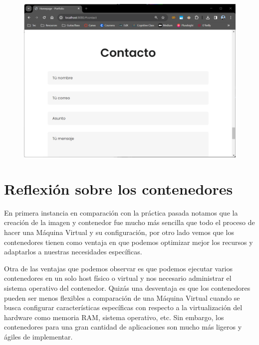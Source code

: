 \documentclass[12pt,a4paper]{article}
\begin{document}
\begin{figure}[H]
    \centering
    \includegraphics[width=.85\linewidth]{M3_Virtualización_y_Contenedores/Tarea_3_Creación_Contenedor_Docker/reporte/figuras/7-2_Resultados.png}
    \label{fig:Resultados_2}
\end{figure}


\section{Reflexión sobre los contenedores}

En primera instancia en comparación con la práctica pasada notamos que la creación de la imagen y contenedor fue mucho más sencilla que todo el proceso de hacer una Máquina Virtual y su configuración, por otro lado vemos que los contenedores tienen como ventaja en que podemos optimizar mejor los recursos y adaptarlos a nuestras necesidades específicas.

\vspace{1em}

Otra de las ventajas que podemos observar es que podemos ejecutar varios contenedores en un solo host físico o virtual y nos necesario administrar el sistema operativo del contenedor. Quizás una desventaja es que los contenedores pueden ser menos flexibles a comparación de una Máquina Virtual cuando se busca configurar características específicas con respecto a la virtualización del hardware como memoria RAM, sistema operativo, etc. Sin embargo, los contenedores para una gran cantidad de aplicaciones son mucho más ligeros y ágiles de implementar.
\end{document}
